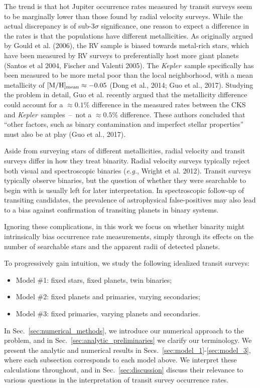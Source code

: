 The trend is that hot Jupiter occurrence rates measured by transit 
surveys seem to be marginally lower than those found by radial velocity 
surveys.
While the actual discrepancy is of sub-$3\sigma$ significance,
one reason to expect a difference in the rates is that the populations have 
different metallicities.
As originally argued by Gould et al. (2006), the RV sample is biased towards 
metal-rich stars, which have been measured by RV surveys to preferentially 
host more giant planets (Santos et al 2004, Fischer and Valenti 2005).
The {\it Kepler}\ sample specifically has been measured to be more metal poor 
than the local neighborhood, with a mean metallicity of $[{\rm M/H}]_{\rm 
mean}\approx -0.05$ (Dong et al., 2014; Guo et al., 2017).
Studying the problem in detail, Guo et al. recently argued that the 
metallicity difference could account for a $\approx 0.1\%$ difference in the 
measured rates between the CKS and {\it Kepler}\ samples~--~not a $\approx 
0.5\%$ difference.
These authors concluded that ``other factors, such as binary contamination and 
imperfect stellar properties'' must also be at play (Guo et al., 2017).

Aside from surveying stars of different metallicities, radial velocity and 
transit surveys differ in how they treat binarity.
Radial velocity surveys typically reject both visual and spectroscopic binaries
({\it e.g.}, Wright et al. 2012).
Transit surveys typically observe binaries, but the question of whether they 
were searchable to begin with is usually left for later interpretation.
In spectroscopic follow-up of transiting candidates, the prevalence of 
astrophysical false-positives may also lead to a bias against confirmation of 
transiting planets in binary systems.

Ignoring these complications, in this work we focus on whether
binarity might intrinsically bias occurrence rate measurements, simply 
through its effects on the number of searchable stars and the apparent radii 
of detected planets.

To progressively gain intuition, we study the following idealized transit 
surveys:
\begin{itemize}
    \item Model \#1: fixed stars, fixed planets, twin binaries;
    \item Model \#2: fixed planets and primaries, varying secondaries;
    \item Model \#3: fixed primaries, varying planets and secondaries.
\end{itemize}
In Sec.~\ref{sec:numerical_methods}, we introduce our numerical approach 
to the problem, and in Sec.~\ref{sec:analytic_preliminaries} we clarify our 
terminology.
We present the analytic and numerical results in 
Secs.~\ref{sec:model_1}-\ref{sec:model_3}, where each subsection corresponds 
to each model above.
We interpret these calculations throughout, and in 
Sec.~\ref{sec:discussion} discuss their relevance to various questions in 
the interpretation of transit survey occurrence rates. 